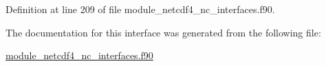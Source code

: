 Definition at line 209 of file module\+\_\+netcdf4\+\_\+nc\+\_\+interfaces.\+f90.



The documentation for this interface was generated from the following file\+:\begin{DoxyCompactItemize}
\item 
\hyperlink{module__netcdf4__nc__interfaces_8f90}{module\+\_\+netcdf4\+\_\+nc\+\_\+interfaces.\+f90}\end{DoxyCompactItemize}
